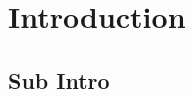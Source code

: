 
\section{Introduction}
\label{chap:intro}

\lipsum[1]

\subsection{Sub Intro}
\label{chap:intro_sub}

\lipsum
